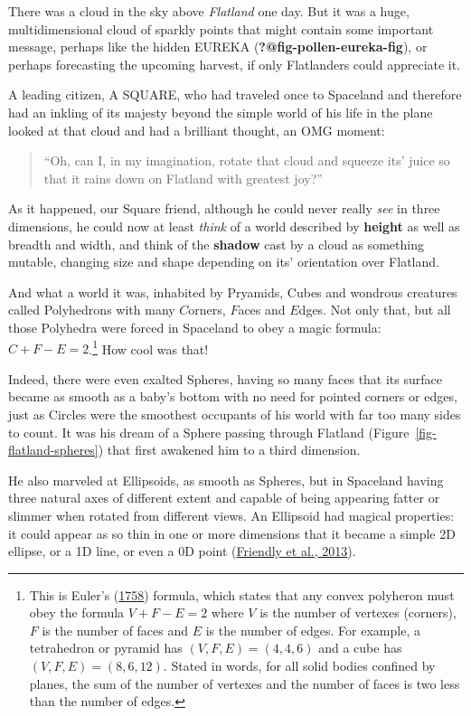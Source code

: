 \documentclass[
  letterpaper,
  10pt,
  krantz2]{krantz}
\begin{document}
There was a cloud in the sky above \emph{Flatland} one day. But it was a
huge, multidimensional cloud of sparkly points that might contain some
important message, perhaps like the hidden EUREKA
(\textbf{?@fig-pollen-eureka-fig}), or perhaps forecasting the upcoming
harvest, if only Flatlanders could appreciate it.

A leading citizen, A SQUARE, who had traveled once to Spaceland and
therefore had an inkling of its majesty beyond the simple world of his
life in the plane looked at that cloud and had a brilliant thought, an
OMG moment:

\begin{quote}
``Oh, can I, in my imagination, rotate that cloud and squeeze its' juice
so that it rains down on Flatland with greatest joy?''
\end{quote}

As it happened, our Square friend, although he could never really
\emph{see} in three dimensions, he could now at least \emph{think} of a
world described by \textbf{height} as well as breadth and width, and
think of the \textbf{shadow} cast by a cloud as something mutable,
changing size and shape depending on its' orientation over Flatland.

And what a world it was, inhabited by Pryamids, Cubes and wondrous
creatures called Polyhedrons with many \(C\)orners, \(F\)aces and
\(E\)dges. Not only that, but all those Polyhedra were forced in
Spaceland to obey a magic formula: \(C + F - E = 2\).\footnote{This is
  Euler's (\protect\hyperlink{ref-Euler:1758}{1758}) formula, which
  states that any convex polyheron must obey the formula
  \(V + F - E = 2\) where \(V\) is the number of vertexes (corners),
  \(F\) is the number of faces and \(E\) is the number of edges. For
  example, a tetrahedron or pyramid has \((V, F, E) = (4, 4, 6)\) and a
  cube has \((V, F, E) = (8, 6, 12)\). Stated in words, for all solid
  bodies confined by planes, the sum of the number of vertexes and the
  number of faces is two less than the number of edges.} How cool was
that!

Indeed, there were even exalted Spheres, having so many faces that its
surface became as smooth as a baby's bottom with no need for pointed
corners or edges, just as Circles were the smoothest occupants of his
world with far too many sides to count. It was his dream of a Sphere
passing through Flatland (Figure~\ref{fig-flatland-spheres}) that first
awakened him to a third dimension.

He also marveled at Ellipsoids, as smooth as Spheres, but in Spaceland
having three natural axes of different extent and capable of being
appearing fatter or slimmer when rotated from different views. An
Ellipsoid had magical properties: it could appear as so thin in one or
more dimensions that it became a simple 2D ellipse, or a 1D line, or
even a 0D point
(\protect\hyperlink{ref-Friendly-etal:ellipses:2013}{Friendly et al.,
2013}).
\end{document}

